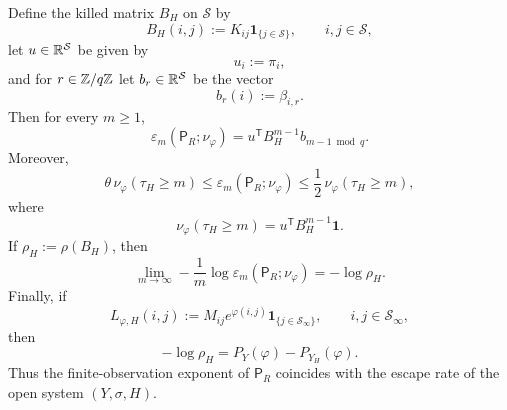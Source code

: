 \begin{theorem}
Define the killed matrix \(B_H\) on \(\mathcal S\) by
\[
  B_H(i,j):=K_{ij}\mathbf{1}_{\{j\in\mathcal S\}},
  \qquad i,j\in\mathcal S,
\]
let \(u\in\mathbb{R}^{\mathcal S}\) be given by
\[
  u_i:=\pi_i,
\]
and for \(r\in\mathbb{Z}/q\mathbb{Z}\) let \(b_r\in\mathbb{R}^{\mathcal S}\) be the vector
\[
  b_r(i):=\beta_{i,r}.
\]
Then for every \(m\geq 1\),
\[
  \varepsilon_m(\mathsf{P}_R;\nu_\varphi)
  = u^{\mathsf T}B_H^{m-1}b_{m-1\bmod q}.
\]
Moreover,
\[
  \theta\,\nu_\varphi(\tau_H\geq m)
  \leq \varepsilon_m(\mathsf{P}_R;\nu_\varphi)
  \leq \frac12\,\nu_\varphi(\tau_H\geq m),
\]
where
\[
  \nu_\varphi(\tau_H\geq m)
  = u^{\mathsf T}B_H^{m-1}\mathbf{1}.
\]
If \(\rho_H:=\rho(B_H)\), then
\[
  \lim_{m\to\infty}
  -\frac1m\log\varepsilon_m(\mathsf{P}_R;\nu_\varphi)
  = -\log\rho_H.
\]
Finally, if
\[
  L_{\varphi,H}(i,j):=M_{ij}e^{\varphi(i,j)}\mathbf{1}_{\{j\in\mathcal S_\infty\}},
  \qquad i,j\in\mathcal S_\infty,
\]
then
\[
  -\log\rho_H
  = P_Y(\varphi)-P_{Y_H}(\varphi).
\]
Thus the finite-observation exponent of \(\mathsf{P}_R\) coincides with
the escape rate of the open system \((Y,\sigma,H)\).
\end{theorem}

